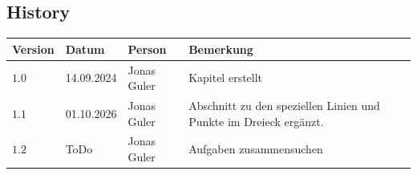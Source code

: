 \documentclass[11pt,oneside]{article}
\begin{document}
\newpage
\subsection*{History}
\begin{table}[H]
	\centering
	\begin{tabular}{|p{13mm}|p{20mm}|p{30mm}|p{70mm}|}\hline
		Version & Datum & Person & Bemerkung \\\hline
		$1.0$ & 14.09.2024 & Jonas Guler & Kapitel erstellt \\\hline
		$1.1$ & 01.10.2026 & Jonas Guler & Abschnitt zu den speziellen Linien und Punkte im Dreieck ergänzt. \\\hline
		$1.2$ & ToDo & Jonas Guler & Aufgaben zusammensuchen \\\hline
	\end{tabular}
\end{table}
\end{document}
